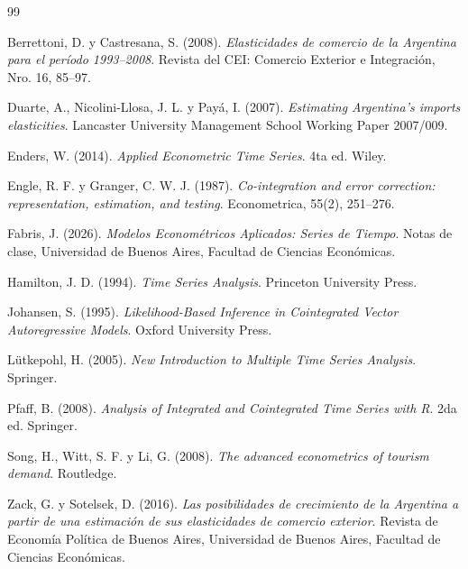 \documentclass[11pt,a4paper]{article}
\begin{document}
	\begin{thebibliography}{99}

		Berrettoni, D. y Castresana, S. (2008).
		\textit{Elasticidades de comercio de la Argentina para el período 1993--2008}.
		Revista del CEI: Comercio Exterior e Integración, Nro. 16, 85--97.

		Duarte, A., Nicolini-Llosa, J. L. y Payá, I. (2007).
		\textit{Estimating Argentina's imports elasticities}.
		Lancaster University Management School Working Paper 2007/009.

		Enders, W. (2014).
		\textit{Applied Econometric Time Series}.
		4ta ed. Wiley.

		Engle, R. F. y Granger, C. W. J. (1987).
		\textit{Co-integration and error correction: representation, estimation, and
			testing}.
		Econometrica, 55(2), 251--276.

		Fabris, J. (2026).
		\textit{Modelos Econométricos Aplicados: Series de Tiempo}.
		Notas de clase, Universidad de Buenos Aires, Facultad de Ciencias Económicas.

		Hamilton, J. D. (1994).
		\textit{Time Series Analysis}.
		Princeton University Press.

		Johansen, S. (1995).
		\textit{Likelihood-Based Inference in Cointegrated Vector Autoregressive Models}.
		Oxford University Press.

		Lütkepohl, H. (2005).
		\textit{New Introduction to Multiple Time Series Analysis}.
		Springer.

		Pfaff, B. (2008).
		\textit{Analysis of Integrated and Cointegrated Time Series with R}.
		2da ed. Springer.

		Song, H., Witt, S. F. y Li, G. (2008).
		\textit{The advanced econometrics of tourism demand}.
		Routledge.

		Zack, G. y Sotelsek, D. (2016).
		\textit{Las posibilidades de crecimiento de la Argentina a partir de una
			estimación de sus elasticidades de comercio exterior}.
		Revista de Economía Política de Buenos Aires, Universidad de Buenos Aires,
		Facultad de Ciencias Económicas.

	\end{thebibliography}
\end{document}
